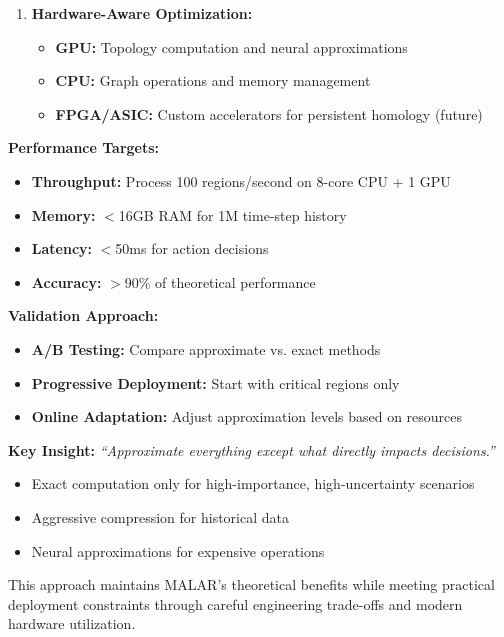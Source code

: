 \documentclass[11pt,english]{article}
\theoremstyle{remark}
\begin{document}
\begin{enumerate}
		\item \textbf{Hardware-Aware Optimization:}
		\begin{itemize}
			\item \textbf{GPU:} Topology computation and neural approximations
			\item \textbf{CPU:} Graph operations and memory management
			\item \textbf{FPGA/ASIC:} Custom accelerators for persistent homology (future)
		\end{itemize}
	\end{enumerate}
	
	\noindent
	\textbf{Performance Targets:}
	\begin{itemize}
		\item \textbf{Throughput:} Process 100 regions/second on 8-core CPU + 1 GPU
		\item \textbf{Memory:} $<$16GB RAM for 1M time-step history
		\item \textbf{Latency:} $<$50ms for action decisions
		\item \textbf{Accuracy:} $>$90\% of theoretical performance
	\end{itemize}
	
	\noindent
	\textbf{Validation Approach:}
	\begin{itemize}
		\item \textbf{A/B Testing:} Compare approximate vs. exact methods
		\item \textbf{Progressive Deployment:} Start with critical regions only
		\item \textbf{Online Adaptation:} Adjust approximation levels based on resources
	\end{itemize}
	
	\vspace{0.1in}
	\noindent
	\textbf{Key Insight:} \textit{``Approximate everything except what directly impacts decisions.''}
	\begin{itemize}
		\item Exact computation only for high-importance, high-uncertainty scenarios
		\item Aggressive compression for historical data
		\item Neural approximations for expensive operations
	\end{itemize}
	
	\noindent
	This approach maintains MALAR's theoretical benefits while meeting practical deployment constraints through careful engineering trade-offs and modern hardware utilization.
\end{document}
